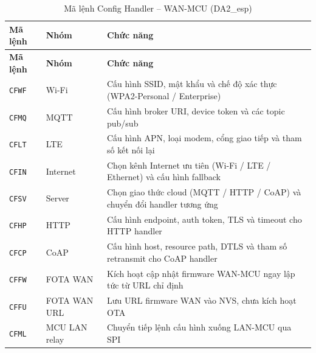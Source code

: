             \begin{longtable}{|p{2cm}|p{2.5cm}|p{10cm}|}
                \caption{Mã lệnh Config Handler -- WAN-MCU (DA2\_esp)}
                \label{tab:config_wan} \\
                \hline
                \textbf{Mã lệnh} & \textbf{Nhóm} & \textbf{Chức năng} \\ \hline
                \endfirsthead
                \hline
                \textbf{Mã lệnh} & \textbf{Nhóm} & \textbf{Chức năng} \\ \hline
                \endhead
                \texttt{CFWF} & Wi-Fi & Cấu hình SSID, mật khẩu và chế độ xác thực (WPA2-Personal / Enterprise) \\ \hline
                \texttt{CFMQ} & MQTT & Cấu hình broker URI, device token và các topic pub/sub \\ \hline
                \texttt{CFLT} & LTE & Cấu hình APN, loại modem, cổng giao tiếp và tham số kết nối lại \\ \hline
                \texttt{CFIN} & Internet & Chọn kênh Internet ưu tiên (Wi-Fi / LTE / Ethernet) và cấu hình fallback \\ \hline
                \texttt{CFSV} & Server & Chọn giao thức cloud (MQTT / HTTP / CoAP) và chuyển đổi handler tương ứng \\ \hline
                \texttt{CFHP} & HTTP & Cấu hình endpoint, auth token, TLS và timeout cho HTTP handler \\ \hline
                \texttt{CFCP} & CoAP & Cấu hình host, resource path, DTLS và tham số retransmit cho CoAP handler \\ \hline
                \texttt{CFFW} & FOTA WAN & Kích hoạt cập nhật firmware WAN-MCU ngay lập tức từ URL chỉ định \\ \hline
                \texttt{CFFU} & FOTA WAN URL & Lưu URL firmware WAN vào NVS, chưa kích hoạt OTA \\ \hline
                \texttt{CFML} & MCU LAN relay & Chuyển tiếp lệnh cấu hình xuống LAN-MCU qua SPI \\ \hline
            \end{longtable}
            
